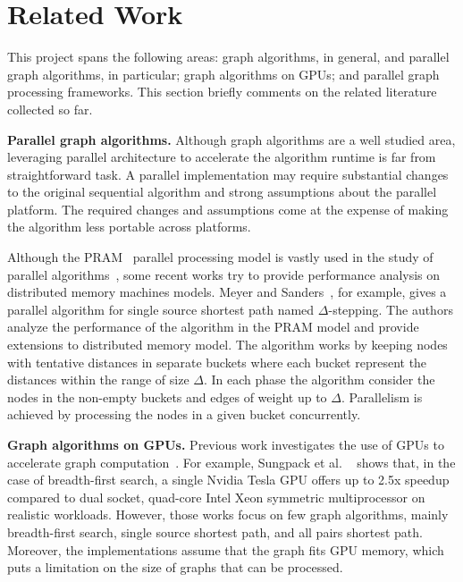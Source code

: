 \section{Related Work}
\label{sec:related}

This project spans the following areas: graph algorithms, in general, and parallel graph algorithms, in particular; graph algorithms on GPUs; and parallel graph processing frameworks. This section briefly comments on the related literature collected so far.

{\bf Parallel graph algorithms.} Although graph algorithms are a well studied area, leveraging parallel architecture to accelerate the algorithm runtime is far from straightforward task. A parallel implementation may require substantial changes to the original sequential algorithm and strong assumptions about the parallel platform. The required changes and assumptions come at the expense of making the algorithm less portable across platforms.

Although the PRAM~\cite{Fortune78} parallel processing model is vastly used in the study of parallel algorithms~\cite{Quinn1984,Atallah1984}, some recent works try to provide performance analysis on distributed memory machines models. Meyer and Sanders~\cite{Meyer2003}, for example, gives a parallel algorithm for single source shortest path named $\Delta$-stepping. The authors analyze the performance of the algorithm in the PRAM model and provide extensions to distributed memory model. The algorithm works by keeping nodes with tentative distances in separate buckets where each bucket represent the distances within the range of size $\Delta$. In each phase the algorithm consider the nodes in the non-empty buckets and edges of weight up to $\Delta$. Parallelism is achieved by processing the nodes in a given bucket concurrently. 

{\bf Graph algorithms on GPUs.} Previous work investigates the use of GPUs to accelerate graph computation~\cite{Harish2007, Katz2008, Sungpack2010, dehne2010exploring}. For example, Sungpack et al. ~\cite{Sungpack2010} shows that, in the case of breadth-first search, a single Nvidia Tesla GPU offers up to 2.5x speedup compared to dual socket, quad-core Intel Xeon symmetric multiprocessor on realistic workloads. However, those works focus on few graph algorithms, mainly breadth-first search, single source shortest path, and all pairs shortest path. Moreover, the implementations assume that the graph fits GPU memory, which puts a limitation on the size of graphs that can be processed. 


